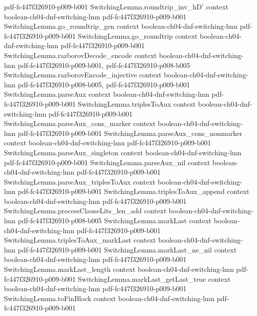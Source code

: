 \begin{lemma}
  {pdf-fc447f326910-p009-b001}
\proofstep
  {SwitchingLemma.roundtrip_inv_hD'}
  {context}
  {boolean-ch04-dnf-switching-lmn}
  {pdf-fc447f326910-p009-b001}
\proofstep
  {SwitchingLemma.go_roundtrip_gen}
  {context}
  {boolean-ch04-dnf-switching-lmn}
  {pdf-fc447f326910-p009-b001}
\proofstep
  {SwitchingLemma.go_roundtrip}
  {context}
  {boolean-ch04-dnf-switching-lmn}
  {pdf-fc447f326910-p009-b001}
\proofstep
  {SwitchingLemma.razborovDecode_encode}
  {context}
  {boolean-ch04-dnf-switching-lmn}
  {pdf-fc447f326910-p009-b001,
    pdf-fc447f326910-p008-b005}
\proofstep
  {SwitchingLemma.razborovEncode_injective}
  {context}
  {boolean-ch04-dnf-switching-lmn}
  {pdf-fc447f326910-p008-b005,
    pdf-fc447f326910-p009-b001}
\proofstep
  {SwitchingLemma.parseAux}
  {context}
  {boolean-ch04-dnf-switching-lmn}
  {pdf-fc447f326910-p009-b001}
\proofstep
  {SwitchingLemma.triplesToAux}
  {context}
  {boolean-ch04-dnf-switching-lmn}
  {pdf-fc447f326910-p009-b001}
\proofstep
  {SwitchingLemma.parseAux_cons_marker}
  {context}
  {boolean-ch04-dnf-switching-lmn}
  {pdf-fc447f326910-p009-b001}
\proofstep
  {SwitchingLemma.parseAux_cons_nonmarker}
  {context}
  {boolean-ch04-dnf-switching-lmn}
  {pdf-fc447f326910-p009-b001}
\proofstep
  {SwitchingLemma.parseAux_singleton}
  {context}
  {boolean-ch04-dnf-switching-lmn}
  {pdf-fc447f326910-p009-b001}
\proofstep
  {SwitchingLemma.parseAux_nil}
  {context}
  {boolean-ch04-dnf-switching-lmn}
  {pdf-fc447f326910-p009-b001}
\proofstep
  {SwitchingLemma.parseAux_triplesToAux}
  {context}
  {boolean-ch04-dnf-switching-lmn}
  {pdf-fc447f326910-p009-b001}
\proofstep
  {SwitchingLemma.triplesToAux_append}
  {context}
  {boolean-ch04-dnf-switching-lmn}
  {pdf-fc447f326910-p009-b001}
\proofstep
  {SwitchingLemma.processClauseLits_len_add}
  {context}
  {boolean-ch04-dnf-switching-lmn}
  {pdf-fc447f326910-p008-b005}
\proofstep
  {SwitchingLemma.markLast}
  {context}
  {boolean-ch04-dnf-switching-lmn}
  {pdf-fc447f326910-p009-b001}
\proofstep
  {SwitchingLemma.triplesToAux_markLast}
  {context}
  {boolean-ch04-dnf-switching-lmn}
  {pdf-fc447f326910-p009-b001}
\proofstep
  {SwitchingLemma.markLast_ne_nil}
  {context}
  {boolean-ch04-dnf-switching-lmn}
  {pdf-fc447f326910-p009-b001}
\proofstep
  {SwitchingLemma.markLast_length}
  {context}
  {boolean-ch04-dnf-switching-lmn}
  {pdf-fc447f326910-p009-b001}
\proofstep
  {SwitchingLemma.markLast_getLast_true}
  {context}
  {boolean-ch04-dnf-switching-lmn}
  {pdf-fc447f326910-p009-b001}
\proofstep
  {SwitchingLemma.toFinBlock}
  {context}
  {boolean-ch04-dnf-switching-lmn}
  {pdf-fc447f326910-p009-b001}

\end{lemma}
